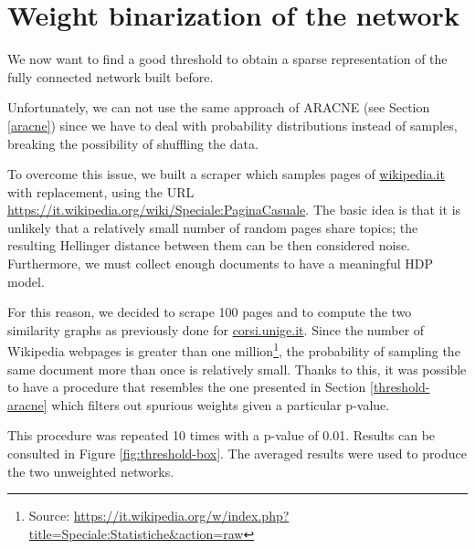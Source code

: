 \section{Weight binarization of the network}
We now want to find a good threshold to obtain a sparse representation of the fully connected network built before.

Unfortunately, we can not use the same approach of ARACNE (see Section \ref{aracne}) 
since we have to deal with probability distributions instead of samples, breaking the 
possibility of shuffling the data. 

To overcome this issue, we built a scraper which samples pages of \url{wikipedia.it} with replacement,
using the URL \url{https://it.wikipedia.org/wiki/Speciale:PaginaCasuale}.
The basic idea is that it is unlikely that a relatively small number of random pages share topics; 
the resulting Hellinger distance between them can be then considered noise. 
Furthermore, we must collect enough documents to have a meaningful HDP model.

For this reason, we decided to scrape 100 pages and to compute the two similarity graphs as previously done for \url{corsi.unige.it}. 
Since the number of Wikipedia webpages is greater than one million\footnote{Source: \url{https://it.wikipedia.org/w/index.php?title=Speciale:Statistiche\&action=raw}},
the probability of sampling the same document more than once is relatively small. 
Thanks to this, it was possible 
to have a procedure that resembles the one presented in Section \ref{threshold-aracne} 
which filters out spurious weights given a particular p-value.

This procedure was repeated 10 times with a p-value of 0.01. Results can be consulted in Figure \ref{fig:threshold-box}.
The averaged results were used to produce the two unweighted networks.

